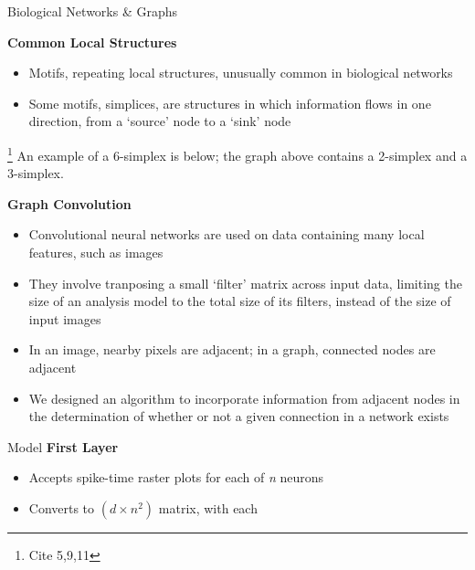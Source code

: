 \documentclass[12pt]{article}
\begin{document}
\begin{posterbard}
\begin{posterboxtitle}{Biological Networks \& Graphs}
\begin{center}
		\end{center}
		\textbf{Common Local Structures}
		\begin{itemize}
			\item Motifs, repeating local structures, unusually common in 
				biological networks
			\item Some motifs, simplices, are structures in which information 
				flows in one direction, from a `source' node to a `sink' node
		\end{itemize}\footnote{Cite 5,9,11}
		An example of a 6-simplex is below; the graph above contains a 2-simplex 
		and a 3-simplex.\\
		\begin{center}
		\end{center}
	\end{posterboxtitle}
	\begin{posterbox}
		\begin{center}\textbf{Graph Convolution}\end{center}
		\begin{itemize}
			\item Convolutional neural networks are used on data containing many 
				local features, such as images
			\item They involve tranposing a small `filter' matrix across input 
				data, limiting the size of an analysis model to the total size 
				of its filters, instead of the size of input images
			\item In an image, nearby pixels are adjacent; in a graph, connected 
				nodes are adjacent
			\item We designed an algorithm to incorporate information from 
				adjacent nodes in the determination of whether or not a given 
				connection in a network exists
		\end{itemize}
		\vspace{\baselineskip}
	\end{posterbox}
	\begin{posterboxtitle}{Model}
		\noindent\textbf{First Layer}
		\begin{itemize}
			\item Accepts spike-time raster plots for each of \textit{n} neurons
			\item Converts to $(d \times n^2)$ matrix, with each 

\end{itemize}
\end{posterboxtitle}
\end{posterbard}
\end{document}
